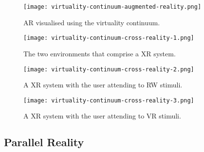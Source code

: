 

\begin{figure}[h]
	\begin{center}
		\texttt{[image: virtuality-continuum-augmented-reality.png]}
		\caption{AR visualised using the virtuality continuum.}
		\label{virtuality-continuum-augmented-reality}
	\end{center}
\end{figure}

\begin{figure}[h]
	\begin{center}
		\texttt{[image: virtuality-continuum-cross-reality-1.png]}
		\caption{The two environments that comprise a XR system.}
		\label{virtuality-continuum-cross-reality-1}
	\end{center}
\end{figure}

\begin{figure}[h]
	\begin{center}
		\texttt{[image: virtuality-continuum-cross-reality-2.png]}
		\caption{A XR system with the user attending to RW stimuli.}
		\label{virtuality-continuum-cross-reality-2}
	\end{center}
\end{figure}

\begin{figure}[h]
	\begin{center}
		\texttt{[image: virtuality-continuum-cross-reality-3.png]}
		\caption{A XR system with the user attending to VR stimuli.}
		\label{virtuality-continuum-cross-reality-3}
	\end{center}
\end{figure}

\subsection{Parallel Reality}

